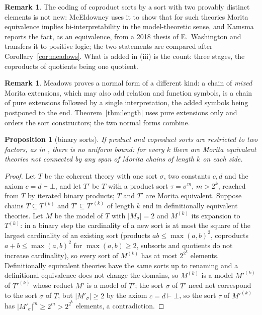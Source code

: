 \documentclass[11pt]{amsart}
\newtheorem{prop}[thm]{Proposition}
\theoremstyle{definition}
\newtheorem{rem}[thm]{Remark}
\begin{document}
\begin{rem}
The coding of coproduct sorts by a sort with two provably distinct
elements is not new: McEldowney \cite[Prop.~5.11]{McEl20} uses it to
show that for such theories Morita equivalence implies
bi-interpretability in the model-theoretic sense, and Kamsma
\cite[Fact~8.6]{Kamsma23} reports the fact, as an equivalence, from a
2018 thesis of E.~Washington and transfers it to positive logic; the
two statements are compared after Corollary~\ref{cor:meadows}. What is
added in (iii) is the count: three stages, the coproducts of quotients
being one quotient.
\end{rem}

\begin{rem}
Meadows \cite[Lemma~46, Cor.~47]{Meadows24} proves a normal form of a
different kind: a chain of \emph{mixed} Morita extensions, which may
also add relation and function symbols, is a chain of pure extensions
followed by a single interpretation, the added symbols being postponed
to the end. Theorem~\ref{thm:length} uses pure extensions only and
orders the sort constructors; the two normal forms combine.
\end{rem}

\begin{prop}[binary sorts]\label{prop:binary}
If product and coproduct sorts are restricted to two factors, as in
\cite{BH16,Meadows24}, there is no uniform bound: for every $k$ there
are Morita equivalent theories not connected by any span of Morita
chains of length $k$ on each side.
\end{prop}
\begin{proof}
Let $T$ be the coherent theory with one sort $\sigma$, two constants
$c,d$ and the axiom $c=d\vdash\bot$, and let $T'$ be $T$ with a product
sort $\tau=\sigma^{m}$, $m>2^k$, reached from $T$ by iterated binary
products; $T$ and $T'$ are Morita equivalent. Suppose chains $T\subseteq
T^{(k)}$ and $T'\subseteq T'^{(k)}$ of length $k$ end in definitionally
equivalent theories. Let $M$ be the model of $T$ with $|M_\sigma|=2$ and
$M^{(k)}$ its expansion to $T^{(k)}$: in a binary step the cardinality of
a new sort is at most the square of the largest cardinality of an
existing sort (products $ab\le\max(a,b)^2$, coproducts $a+b\le
\max(a,b)^2$ for $\max(a,b)\ge2$, subsorts and quotients do not
increase cardinality), so every sort of $M^{(k)}$ has at most $2^{2^k}$
elements. Definitionally equivalent theories have the same sorts up to
renaming and a definitional equivalence does not change the domains, so
$M^{(k)}$ is a model $M'^{(k)}$ of $T'^{(k)}$ whose reduct $M'$ is a model
of $T'$; the sort $\sigma$ of $T'$ need not correspond to the sort
$\sigma$ of $T$, but $|M'_\sigma|\ge2$ by the axiom $c=d\vdash\bot$, so
the sort $\tau$ of $M'^{(k)}$ has $|M'_\sigma|^{m}\ge2^{m}>2^{2^k}$
elements, a contradiction.
\end{proof}
\end{document}
